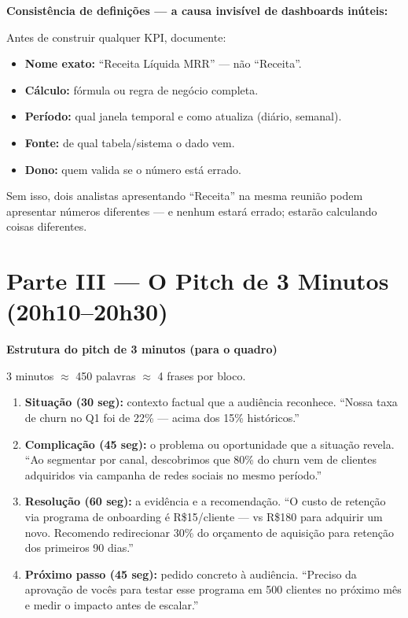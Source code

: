\begin{SolvedBox}
\textbf{Consistência de definições — a causa invisível de dashboards inúteis:}

Antes de construir qualquer KPI, documente:
\begin{itemize}
  \item \textbf{Nome exato:} ``Receita Líquida MRR'' — não ``Receita''.
  \item \textbf{Cálculo:} fórmula ou regra de negócio completa.
  \item \textbf{Período:} qual janela temporal e como atualiza (diário, semanal).
  \item \textbf{Fonte:} de qual tabela/sistema o dado vem.
  \item \textbf{Dono:} quem valida se o número está errado.
\end{itemize}

Sem isso, dois analistas apresentando ``Receita'' na mesma reunião podem
apresentar números diferentes — e nenhum estará errado; estarão calculando
coisas diferentes.
\end{SolvedBox}

\section{Parte III — O Pitch de 3 Minutos (20h10–20h30)}

\begin{BoardBox}
\textbf{Estrutura do pitch de 3 minutos (para o quadro)}

3 minutos $\approx$ 450 palavras $\approx$ 4 frases por bloco.

\begin{enumerate}
  \item \textbf{Situação (30 seg):} contexto factual que a audiência reconhece.
  ``Nossa taxa de churn no Q1 foi de 22\% — acima dos 15\% históricos.''
  \item \textbf{Complicação (45 seg):} o problema ou oportunidade que a situação revela.
  ``Ao segmentar por canal, descobrimos que 80\% do churn vem de clientes
  adquiridos via campanha de redes sociais no mesmo período.''
  \item \textbf{Resolução (60 seg):} a evidência e a recomendação.
  ``O custo de retenção via programa de onboarding é R\$15/cliente — vs
  R\$180 para adquirir um novo. Recomendo redirecionar 30\% do orçamento
  de aquisição para retenção dos primeiros 90 dias.''
  \item \textbf{Próximo passo (45 seg):} pedido concreto à audiência.
  ``Preciso da aprovação de vocês para testar esse programa em 500 clientes
  no próximo mês e medir o impacto antes de escalar.''
\end{enumerate}
\end{BoardBox}

